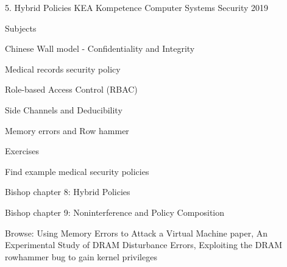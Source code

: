 \documentclass[Screen16to9,17pt]{foils}
\begin{document}
\mytitlepage
{5. Hybrid Policies}
{KEA Kompetence Computer Systems Security 2019}



\begin{list1}
\item Subjects
\begin{list2}
\item Chinese Wall model - Confidentiality and Integrity
\item Medical records security policy
\item Role-based Access Control (RBAC)
\item Side Channels and Deducibility
\item Memory errors and Row hammer
\end{list2}
\item Exercises
\begin{list2}
\item Find example medical security policies
\item
\end{list2}
\end{list1}




\begin{list1}
\item Bishop chapter 8: Hybrid Policies
\item Bishop chapter 9: Noninterference and Policy Composition
\item Browse: Using Memory Errors to Attack a Virtual Machine paper, An Experimental Study of DRAM Disturbance Errors, Exploiting the DRAM rowhammer bug to gain kernel privileges 
\end{list1}













\slidenext
\end{document}
